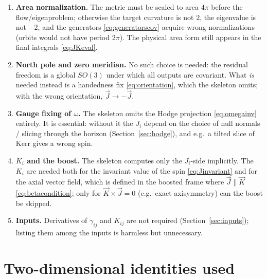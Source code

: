\documentclass[11pt]{article}
\newcommand{\epso}{\mathring{\epsilon}} %
\newcommand{\vJ}{\vec{J}}
\newcommand{\vK}{\vec{K}}
\begin{document}
\begin{enumerate}
  $\oint\chi_i\chi_j\,\epso = \frac{4\pi}{3}\delta_{ij}$, not the coordinate
  or physical measure.
\item \textbf{Area normalization.}  The metric must be scaled to area $4\pi$
  before the flow/eigenproblem; otherwise the target curvature is not $2$,
  the eigenvalue is not $-2$, and the generators
  \eqref{eq:generatorscov} acquire wrong normalizations (orbits would not
  have period $2\pi$).  The physical area form still appears in the final
  integrals \eqref{eq:JKeval}.
\item \textbf{North pole and zero meridian.}  No such choice is needed: the
  residual freedom is a global $SO(3)$ under which all outputs are
  covariant.  What \emph{is} needed instead is a handedness fix
  \eqref{eq:orientation}, which the skeleton omits; with the wrong
  orientation, $\vJ \to -\vJ$.
\item \textbf{Gauge fixing of $\omega$.}  The skeleton omits the Hodge
  projection \eqref{eq:omegainv} entirely.  It is essential: without it the
  $J_i$ depend on the choice of null normals / slicing through the horizon
  (Section~\ref{sec:hodge}), and e.g.\ a tilted slice of Kerr gives a wrong
  spin.
\item \textbf{$K_i$ and the boost.}  The skeleton computes only the
  $J_i$-side implicitly.  The $K_i$ are needed both for the invariant value
  of the spin \eqref{eq:Jinvariant} and for the axial vector field, which is
  defined in the boosted frame where $\vJ\parallel\vK$
  \eqref{eq:betacondition}; only for $\vK\times\vJ = 0$ (e.g.\ exact
  axisymmetry) can the boost be skipped.
\item \textbf{Inputs.}  Derivatives of $\gamma_{ij}$ and $K_{ij}$ are not
  required (Section~\ref{sec:inputs}); listing them among the inputs is
  harmless but unnecessary.
\end{enumerate}

\section{Two-dimensional identities used}
\label{app:identities}
\end{document}
